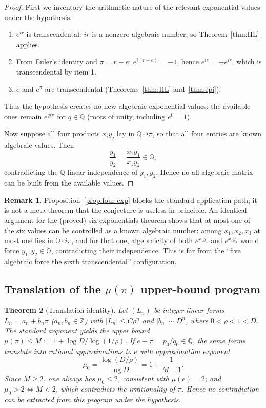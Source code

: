 \documentclass[11pt]{amsart}
\newtheorem{theorem}{Theorem}[section]
\theoremstyle{definition}
\newtheorem{remark}[theorem]{Remark}
\theoremstyle{remark}
\numberwithin{equation}{section}
\newcommand{\Q}{\mathbb{Q}}
\newcommand{\Z}{\mathbb{Z}}
\newcommand{\irr}{\mu}
\newcommand{\ee}{e}
\begin{document}
\begin{proof}
First we inventory the arithmetic nature of the relevant exponential values under the hypothesis.
\begin{enumerate}
\item $\ee^{ir}$ is transcendental: $ir$ is a nonzero algebraic number, so Theorem~\ref{thm:HL} applies.
\item From Euler's identity and $\pi=r-e$: $\ee^{i(r-e)}=-1$, hence $\ee^{ie}=-\ee^{ir}$, which is transcendental by item 1.
\item $\ee$ and $\ee^\pi$ are transcendental (Theorems~\ref{thm:HL} and~\ref{thm:epi}).
\end{enumerate}
Thus the hypothesis creates no new algebraic exponential values: the available ones remain $\ee^{qi\pi}$ for $q\in\Q$ (roots of unity, including $\ee^0=1$).

Now suppose all four products $x_iy_j$ lay in $\Q\cdot i\pi$, so that all four entries are known algebraic values. Then
\[
\frac{y_1}{y_2}=\frac{x_1y_1}{x_1y_2}\in\Q,
\]
contradicting the $\Q$-linear independence of $y_1,y_2$. Hence no all-algebraic matrix can be built from the available values.
\end{proof}

\begin{remark}
Proposition~\ref{prop:four-exp} blocks the standard application path; it is not a meta-theorem that the conjecture is useless in principle. An identical argument for the (proved) six exponentials theorem shows that at most one of the six values can be controlled as a known algebraic number: among $x_1,x_2,x_3$ at most one lies in $\Q\cdot i\pi$, and for that one, algebraicity of both $\ee^{x_1y_1}$ and $\ee^{x_1y_2}$ would force $y_1,y_2\in\Q$, contradicting their independence. This is far from the ``five algebraic force the sixth transcendental'' configuration.
\end{remark}

\subsection{Translation of the \texorpdfstring{$\irr(\pi)$}{mu(pi)} upper-bound program}

\begin{theorem}[Translation identity]\label{thm:translation}
Let $(L_n)$ be integer linear forms $L_n=a_n+b_n\pi$ ($a_n,b_n\in\Z$) with $|L_n|\le C\rho^n$ and $|b_n|\sim D^n$, where $0<\rho<1<D$. The standard argument yields the upper bound $\irr(\pi)\le M:=1+\log D/\log(1/\rho)$. If $e+\pi=p_0/q_0\in\Q$, the same forms translate into rational approximations to $\ee$ with approximation exponent
\[
\irr_0=\frac{\log(D/\rho)}{\log D}=1+\frac{1}{M-1}.
\]
Since $M\ge2$, one always has $\irr_0\le2$, consistent with $\irr(\ee)=2$; and $\irr_0>2\iff M<2$, which contradicts the irrationality of $\pi$. Hence no contradiction can be extracted from this program under the hypothesis.
\end{theorem}
\end{document}
